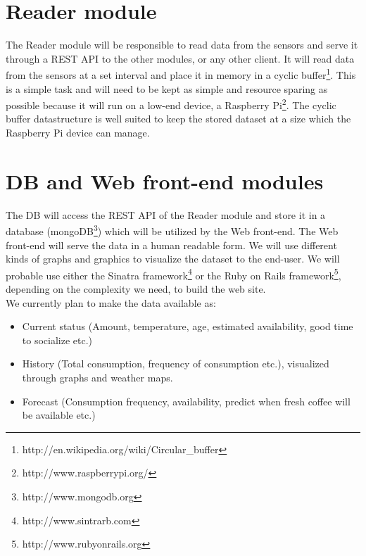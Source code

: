 \documentclass[a4paper]{article}
\begin{document}
\section{Reader module}
The Reader module will be responsible to read data from the sensors and serve it through a REST API to the other modules, or any other client. It will read data from
the sensors at a set interval and place it in memory in a cyclic buffer\footnote{http://en.wikipedia.org/wiki/Circular\_buffer}. This is a simple task and will need 
to be kept as simple and resource sparing as possible because it will run on a low-end device, a Raspberry Pi\footnote{http://www.raspberrypi.org/}. The cyclic buffer 
datastructure is well suited to keep the stored dataset at a size which the Raspberry Pi device can manage. \\

\section{DB and Web front-end modules}
The DB will access the REST API of the Reader module and store it in a database (mongoDB\footnote{http://www.mongodb.org}) which will be utilized by the Web front-end. The Web front-end will serve
the data in a human readable form. We will use different kinds of graphs and graphics to visualize the dataset to the end-user. We will probable use either the Sinatra framework\footnote{http://www.sintrarb.com}
or the Ruby on Rails framework\footnote{http://www.rubyonrails.org}, depending on the complexity we need, to build the web site.\\

We currently plan to make the data available as:
\begin{itemize}
\item Current status (Amount, temperature, age, estimated availability, good time to socialize etc.)
\item History (Total consumption, frequency of consumption etc.), visualized through graphs and weather maps.
\item Forecast (Consumption frequency, availability, predict when fresh coffee will be available etc.) 
\end{itemize}
\end{document}
